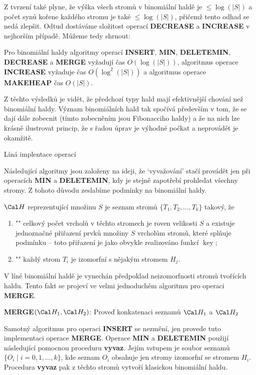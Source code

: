 \documentclass[a4paper,12pt]{article}
\def \emph#1{\underbar{#1}}
\DeclareMathOperator*{\key}{key}
\begin{document}
Z tvrzení také plyne, že výška všech stromů v 
binomiální haldě je $\le\log(|S|)$ a počet synů 
kořene každého stromu je 
také $\le\log(|S|)$, přičemž tento odhad se nedá zlepšit. Odtud 
dostáváme složitost operací {\bf DECREASE} a {\bf INCREASE} v nejhorším 
případě. Můžeme tedy shrnout:

\begin{veta}Pro binomiální haldy algoritmy operací 
{\bf IN\-SERT}, {\bf MIN}, {\bf DELETEMIN}, {\bf DECREASE} a {\bf MERGE  }
vy\-ža\-dují čas $O(\log(|S|))$, algoritmus operace {\bf INCRE\-ASE }
vy\-ža\-duje čas $O(\log^2(|S|))$ a algoritmus operace {\bf MAKEHEAP 
}čas $O(|S|)$.
\end{veta}

Z těchto výsledků je vidět, že předchozí 
typy hald mají efektivnější chování než binomiální haldy. 
Význam binomiálních hald tak spo\-čí\-vá především v 
tom, že se dají dále zobecnit (tímto zobecněním jsou Fibonacciho 
haldy) a že na nich lze krásně 
ilustrovat princip, že s řadou úprav je výhodné počkat 
a neprovádět je okamžitě.

\head
Líná implentace operací
\endhead

Následující algoritmy jsou založeny na ideji, že 
`vyvažování' stačí provádět jen při operacích {\bf MIN} a 
{\bf DELETEMIN}, kdy je stejně zapotřebí prohledat všechny 
stromy. Z tohoto důvodu zeslabíme podmínky na 
binomiální haldy.

\emph{Líná} \emph{binomiální} \emph{halda} $\Cal H$ 
reprezentující množinu $S$ je seznam stromů 
$\{T_1,T_2,\dots,T_k\}$ takový, že  
\begin{enumerate}
\item"{}"
celkový počet vrcholů v těchto stromech je 
roven velikosti $S$ a 
existuje jednoznačné přiřazení prvků množiny 
$S$ vrcholům stromů, které splňuje 
podmínku  -- toto přiřazení je jako obvykle 
realizováno funkcí $\key$;
\item"{}"
každý strom $T_i$ je izomorfní s nějakým stromem $H_
j$.
\end{enumerate}

V líné binomiální haldě je vynechán předpoklad 
neizo\-morf\-nosti stromů tvořících haldu. Tento fakt se 
projeví ve velmi jednoduchém algoritmu pro operaci 
{\bf MERGE}.

{\bf MERGE$(\Cal H_1,\Cal H_2)$}:\newline 
Prove\v d konkatenaci seznamů $\Cal H_1$ a $\Cal H_2$

Samotný algoritmus pro operaci {\bf INSERT} se nezmění, jen 
provede tuto implementaci ope\-race {\bf MER\-GE}.  Ope\-race 
{\bf MIN} a {\bf DELETE\-MIN} použijí následující pomocnou 
proceduru {\bf vyvaz}.  Jejím vstu\-pem je soubor 
seznamů $\{O_i\mid i=0,1,\dots,k\}$, kde seznam $O_i$ 
obsahuje jen stromy izomorfní se stromem $H_i$.  
Procedura {\bf vyvaz} pak z těchto stromů vytvoří 
klasickou binomiální hal\-du. 
\end{document}
